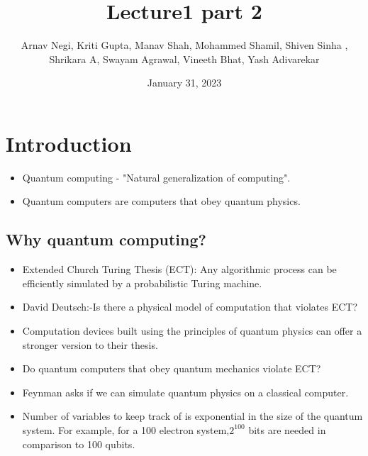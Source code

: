 \documentclass{article}
\title{Lecture1 part 2}
\author{Arnav Negi, Kriti Gupta, Manav Shah, Mohammed Shamil, Shiven Sinha ,\\Shrikara A, Swayam Agrawal, Vineeth Bhat, Yash Adivarekar}
\date{January 31, 2023}
\begin{document}
\maketitle

\section{Introduction}
\begin{itemize}
    \item Quantum computing - "Natural generalization of computing".
\end{itemize}
\begin{itemize}
    \item Quantum computers are computers that obey quantum physics.
\end{itemize}


\subsection{Why quantum computing?}
\begin{itemize}
    \item Extended Church Turing Thesis (ECT): Any algorithmic process can be efficiently simulated by a probabilistic Turing machine. 
\end{itemize}
\begin{itemize}
    \item David Deutsch:-Is there a physical model of computation that violates ECT?
\end{itemize}
\begin{itemize}
    \item Computation devices built using the principles of quantum physics can offer a stronger version to their thesis.
\end{itemize}\begin{itemize}
    \item Do quantum computers that obey quantum mechanics violate ECT?
\end{itemize}\begin{itemize}
    \item Feynman asks if we can simulate quantum physics on a classical computer.
\end{itemize}\begin{itemize}
    \item Number of variables to keep track of is exponential in the size of the quantum system. For example, for a 100 electron system,${2^{100}}$ bits are needed in comparison to 100 qubits.
\end{itemize}
\end{document}
